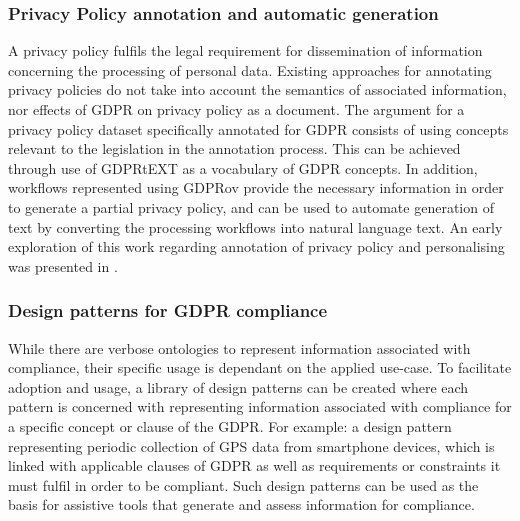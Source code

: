 \subsubsection{Privacy Policy annotation and automatic generation}
A privacy policy fulfils the legal requirement for dissemination of information concerning the processing of personal data. Existing approaches for annotating privacy policies \cite{oltramari_privonto:_2018,harkous_polisis:_2018} do not take into account the semantics of associated information, nor effects of GDPR on privacy policy as a document. The argument for a privacy policy dataset specifically annotated for GDPR \cite{galle_case_2019} consists of using concepts relevant to the legislation in the annotation process. This can be achieved through use of GDPRtEXT as a vocabulary of GDPR concepts. In addition, workflows represented using GDPRov provide the necessary information in order to generate a partial privacy policy, and can be used to automate generation of text by converting the processing workflows into natural language text. An early exploration of this work regarding annotation of  privacy policy and personalising was presented in \cite{pandit_personalised_2018}.

\subsubsection{Design patterns for GDPR compliance}
While there are verbose ontologies to represent information associated with compliance, their specific usage is dependant on the applied use-case. To facilitate adoption and usage, a library of design patterns can be created where each pattern is concerned with representing information associated with compliance for a specific concept or clause of the GDPR. For example: a design pattern representing periodic collection of GPS data from smartphone devices, which is linked with applicable clauses of GDPR as well as requirements or constraints it must fulfil in order to be compliant. Such design patterns can be used as the basis for assistive tools that generate and assess information for compliance.


